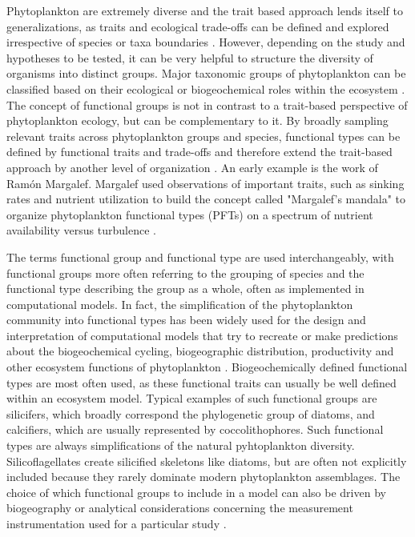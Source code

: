 Phytoplankton are extremely diverse 
and the trait based approach lends itself to generalizations, 
as traits and ecological trade-offs can be defined and explored irrespective of species or taxa boundaries \citep{McGill2006}. 
However, depending on the study and hypotheses to be tested, it can be very helpful to structure the diversity of organisms into distinct groups. Major taxonomic groups of phytoplankton can be classified based on their ecological or biogeochemical roles within the ecosystem \citep{Iglesias-Rodriguez2002,Flynn2015}. The concept of functional groups is not in contrast to a trait-based perspective of phytoplankton ecology, but can be complementary to it. By broadly sampling relevant traits across phytoplankton groups and species, functional types can be defined by functional traits and trade-offs and therefore extend the trait-based approach by another level of organization \citep{Litchman2007d}. An early example is the work of Ramón Margalef. Margalef used observations of important traits, such as sinking rates and nutrient utilization to build the concept called "Margalef's mandala" to organize phytoplankton functional types (PFTs) on a spectrum of nutrient availability versus turbulence \citep{Margalef1978}. 

The terms functional group and functional type are used interchangeably, with functional groups more often referring to the grouping of species and the functional type describing the group as a whole, often as implemented in computational models. In fact, the simplification of the phytoplankton community into functional types has been widely used for the design and interpretation of computational models that try to recreate or make predictions about the biogeochemical cycling, biogeographic distribution, productivity and other ecosystem functions of phytoplankton \citep{Gregg2003,LeQuere2005}. Biogeochemically defined functional types are most often used, as these functional traits can usually be well defined within an ecosystem model. Typical examples of such functional groups are silicifers, which broadly correspond the phylogenetic group of diatoms, and calcifiers, which are usually represented by coccolithophores. Such functional types are always simplifications of the natural pyhtoplankton diversity. Silicoflagellates create silicified skeletons like diatoms, but are often not explicitly included because they rarely dominate modern phytoplankton assemblages. The choice of which functional groups to include in a model can also be driven by biogeography or analytical considerations concerning the measurement instrumentation used for a particular study \citep{IrwinAndrewJ.Finkel2017b}.
 
